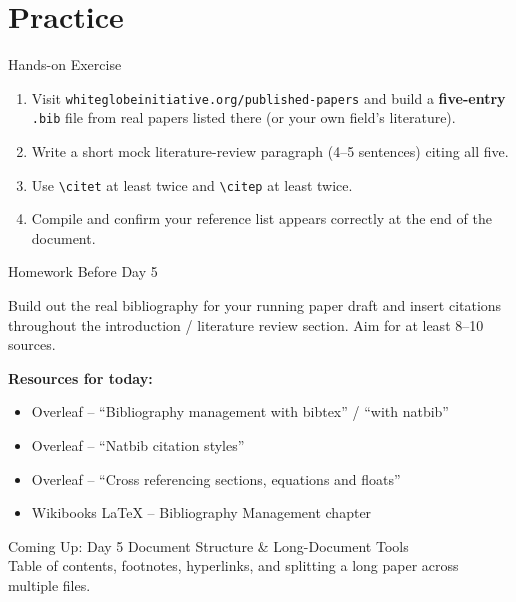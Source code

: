 \documentclass[11pt,aspectratio=169]{beamer}
\begin{document}
\section{Practice}

\begin{frame}{Hands-on Exercise}
  \begin{exercisebox}
    \begin{enumerate}
      \item Visit \texttt{whiteglobeinitiative.org/published-papers}
        and build a \textbf{five-entry} \texttt{.bib} file from real
        papers listed there (or your own field's literature).
      \item Write a short mock literature-review paragraph (4--5
        sentences) citing all five.
      \item Use \texttt{\textbackslash citet} at least twice and
        \texttt{\textbackslash citep} at least twice.
      \item Compile and confirm your reference list appears correctly
        at the end of the document.
    \end{enumerate}
  \end{exercisebox}
\end{frame}

\begin{frame}{Homework Before Day 5}
  \begin{homeworkbox}
    Build out the real bibliography for your running paper draft and
    insert citations throughout the introduction / literature review
    section. Aim for at least 8--10 sources.
  \end{homeworkbox}
  \vspace{10pt}
  \small\textbf{Resources for today:}
  \begin{itemize}\small
    \item Overleaf -- ``Bibliography management with bibtex'' / ``with natbib''
    \item Overleaf -- ``Natbib citation styles''
    \item Overleaf -- ``Cross referencing sections, equations and floats''
    \item Wikibooks LaTeX -- Bibliography Management chapter
  \end{itemize}
\end{frame}

\begin{frame}{Coming Up: Day 5}
  \Large
  \centering
  Document Structure \& Long-Document Tools \\[6pt]
  \normalsize
  Table of contents, footnotes, hyperlinks, and splitting a long paper
  across multiple files.
\end{frame}
\end{document}
